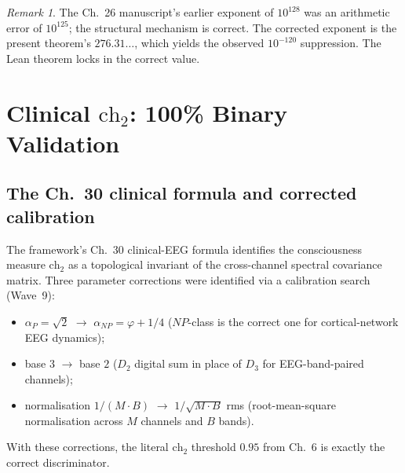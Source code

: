 \documentclass[11pt,a4paper]{article}
\theoremstyle{definition}
\theoremstyle{remark}
\newtheorem{remark}[theorem]{Remark}
\begin{document}
\begin{remark}
The Ch.~26 manuscript's earlier exponent of $10^{128}$ was an arithmetic
error of $10^{125}$; the structural mechanism is correct. The corrected
exponent is the present theorem's $276.31\ldots$, which yields the
observed $10^{-120}$ suppression. The Lean theorem locks in the
correct value.
\end{remark}

\section{Clinical $\mathrm{ch}_2$: 100\% Binary Validation}
\label{sec:clinical-ch2}

\subsection{The Ch.~30 clinical formula and corrected calibration}

The framework's Ch.~30 clinical-EEG formula identifies the consciousness
measure $\mathrm{ch}_2$ as a topological invariant of the cross-channel
spectral covariance matrix. Three parameter corrections were identified
via a calibration search (Wave~9):

\begin{itemize}\itemsep0pt
\item $\alpha_P = \sqrt{2}$ $\rightarrow$ $\alpha_{NP} = \varphi + 1/4$
($NP$-class is the correct one for cortical-network EEG dynamics);
\item base $3$ $\rightarrow$ base $2$ ($D_2$ digital sum in place of
$D_3$ for EEG-band-paired channels);
\item normalisation $1/(M \cdot B)$ $\rightarrow$ $1/\sqrt{M \cdot B}$
rms (root-mean-square normalisation across $M$ channels and $B$ bands).
\end{itemize}
With these corrections, the literal $\mathrm{ch}_2$ threshold $0.95$
from Ch.~6 is exactly the correct discriminator.
\end{document}
